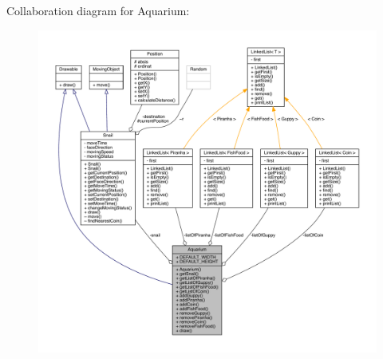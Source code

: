 Collaboration diagram for Aquarium\+:
\nopagebreak
\begin{figure}[H]
\begin{center}
\leavevmode
\includegraphics[width=350pt]{class_aquarium__coll__graph}
\end{center}
\end{figure}
